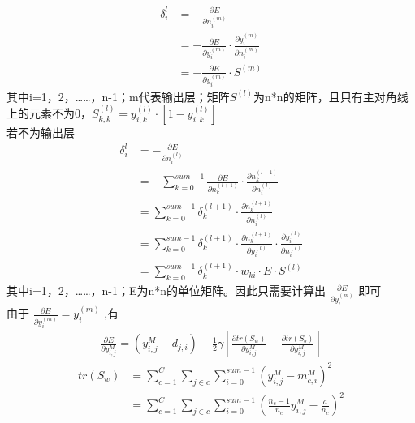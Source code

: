 \documentclass[UTF8]{ctexart}
\begin{document}
\begin{equation}
\begin{aligned}
\delta_{i}^{l}&=-\frac{\partial E}{\partial n_{i}^{(m)}}\\
&=-\frac{\partial E}{\partial y_{i}^{(m)}}\cdot \frac {\partial y_{i}^{(m)}}{\partial n_{i}^{(m)}}\\
&=-\frac{\partial E}{\partial y_{i}^{(m)}}\cdot S^{(m)}
\end{aligned}
\end{equation}
其中i=1，2，……，n-1；m代表输出层；矩阵$S^{(l)}$为n*n的矩阵，且只有主对角线上的元素不为0，$ S_{k,k}^{(l)}=y_{i,k}^{(l)}\cdot [1-y_{i,k}^{(l)}] $\\
若不为输出层
\begin{equation}
\begin{aligned}
\delta_{i}^{l}&=-\frac{\partial E}{\partial n_{i}^{(l)}}\\
&=-\sum_{k=0}^{sum-1}\frac{\partial E}{\partial n_{k}^{(l+1)}}\cdot \frac{\partial n_{k}^{(l+1)}}{\partial n_{i}^{(l)}}\\
&=\sum_{k=0}^{sum-1}\delta_{k}^{(l+1)}\cdot \frac{\partial n_{k}^{(l+1)}}{\partial n_{i}^{(l)}}\\
&=\sum_{k=0}^{sum-1}\delta_{k}^{(l+1)}\cdot \frac{\partial n_{k}^{(l+1)}}{\partial y_{i}^{(l)}}\cdot \frac{\partial y_{i}^{(l)}}{\partial n_{i}^{(l)}}\\
&=\sum_{k=0}^{sum-1}\delta_{k}^{(l+1)}\cdot w_{ki} \cdot E \cdot S^{(l)}
\end{aligned}
\end{equation}
其中i=1，2，……，n-1；E为n*n的单位矩阵。因此只需要计算出 $ \frac{\partial E}{\partial y_{i}^{(m)}} $ 即可\\
由于 $ \frac{\partial E}{\partial y_{i}^{(m)}}=y_{i}^{(m)} $ ,有
\begin{equation}
\begin{aligned}
\frac{\partial E}{\partial y_{i,j}^{M}}=(y_{i,j}^{M}-d_{j,i})+\frac {1}{2} \gamma [\frac{\partial tr(S_{w})}{\partial y_{i,j}^{M}}-\frac{\partial tr(S_{b})}{\partial y_{i,j}^{M}}]
\end{aligned}
\end{equation}
\begin{equation}
\begin{aligned}
tr(S_{w})&=\sum_{c=1}^{C}\sum_{j\in c}\sum_{i=0}^{sum-1}(y_{i,j}^{M}-m_{c,i}^{M})^{2}\\
&=\sum_{c=1}^{C}\sum_{j\in c}\sum_{i=0}^{sum-1}(\frac {n_{c}-1}{n_{c}}y_{i,j}^{M}-\frac {a}{n_{c}})^{2}
\end{aligned}
\end{equation}
\end{document}
